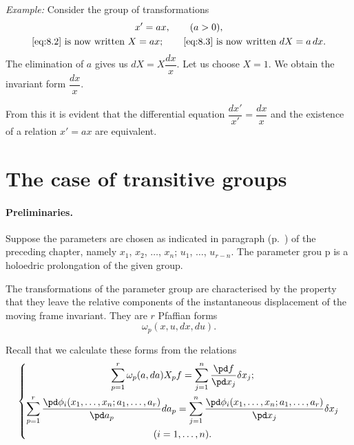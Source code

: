 \somespace

{\small
\emph{Example:} Consider the group of transformations
\begin{gather*}
  x'=ax,\qquad(a>0),\\
  \text{\eqref{eq:8.2} is now written }X=ax;\qquad
  \text{\eqref{eq:8.3} is now written }dX=a\,dx.
\end{gather*}
The elimination of $a$ gives us $dX=X\dfrac{dx}{x}$. Let us choose $X=1$. We obtain the invariant form $\dfrac{dx}{x}$.

From this it is evident that the differential equation $\dfrac{dx'}{x'}=\dfrac{dx}{x}$ and the existence of a relation $x'=ax$ are equivalent.}



\section{The case of transitive groups}
\label{sec:case-trans-groups}

\paragraph{Preliminaries.}
\label{sec:108}
Suppose the parameters are chosen as indicated in paragraph  (p.~\pageref{sec:100}) of the preceding chapter, namely $x_{1}$, $x_{2}$, $\dots$, $x_{n}$; $u_{1}$, $\dots$, $u_{r-n}$. The parameter grou p is a holoedric prolongation of the given group.

The transformations of the parameter group are characterised by the property that they leave the relative components of the instantaneous displacement of the moving frame invariant. They are $r$ Pfaffian forms
\[
\omega_{p}(x,u,dx,du).
\]

Recall that we calculate these forms from the relations
\begin{equation}
  \label{eq:8.6}
  \left\{
    \begin{gathered}
      \sum_{p=1}^{r}\omega_{p}(a,da)X_{p}f=\sum_{j=1}^{n}\frac{\pd f}{\pd x_{j}}\delta x_{j};\\
      \sum_{p=1}^{r}\frac{\pd\phi_{i}(x_{1},\dots,x_{n};a_{1},\dots,a_{r})}{\pd a_{p}}da_{p}=\sum_{j=1}^{n}\frac{\pd \phi_{i}(x_{1},\dots,x_{n};a_{1},\dots,a_{r})}{\pd x_{j}}\delta x_{j}\\
      (i=1,\dots,n).
    \end{gathered}
  \right.
\end{equation}

\somespace

